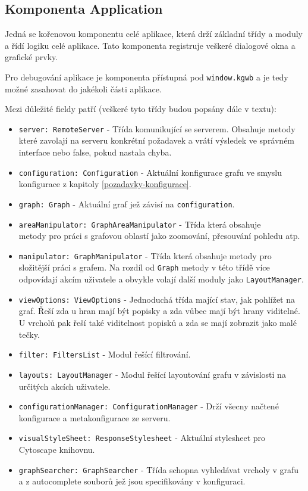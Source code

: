\subsection{Komponenta Application}
Jedná se kořenovou komponentu celé aplikace, která drží základní třídy a moduly a řídí logiku celé aplikace. Tato komponenta registruje veškeré dialogové okna a grafické prvky.

Pro debugování aplikace je komponenta přístupná pod \texttt{window.kgwb} a je tedy možné zasahovat do jakékoli části aplikace.

Mezi důležité fieldy patří (veškeré tyto třídy budou popsány dále v textu):
\begin{itemize}
  \item \texttt{server: RemoteServer} - Třída komunikující se serverem. Obsahuje metody které zavolají na serveru konkrétní požadavek a vrátí výsledek ve správném interface nebo false, pokud nastala chyba.
  \item \texttt{configuration: Configuration} - Aktuální konfigurace grafu ve smyslu konfigurace z kapitoly \ref{pozadavky-konfigurace}.
  \item \texttt{graph: Graph} - Aktuální graf jež závisí na \texttt{configuration}.
  \item \texttt{areaManipulator: GraphAreaManipulator} - Třída která obsahuje \\ metody pro práci s grafovou oblastí jako zoomování, přesouvání pohledu atp.
  \item \texttt{manipulator: GraphManipulator} - Třída která obsahuje metody pro složitější práci s grafem. Na rozdíl od \texttt{Graph} metody v této třídě více odpovídají akcím uživatele a obvykle volají další moduly jako \texttt{LayoutManager}.
  \item \texttt{viewOptions: ViewOptions} - Jednoduchá třída mající stav, jak pohlížet na graf. Řeší zda u hran mají být popisky a zda vůbec mají být hrany viditelné. U vrcholů pak řeší také viditelnost popisků a zda se mají zobrazit jako malé tečky.
  \item \texttt{filter: FiltersList} - Modul řešící filtrování.
  \item \texttt{layouts: LayoutManager} - Modul řešící layoutování grafu v závislosti na určitých akcích uživatele.
  \item \texttt{configurationManager: ConfigurationManager} - Drží všecny načtené konfigurace a metakonfigurace ze serveru.
  \item \texttt{visualStyleSheet: ResponseStylesheet} - Aktuální stylesheet pro \\ Cytoscape knihovnu.
  \item \texttt{graphSearcher: GraphSearcher} - Třída schopna vyhledávat vrcholy v grafu a z autocomplete souborů jež jsou specifikovány v konfiguraci.
\end{itemize}

